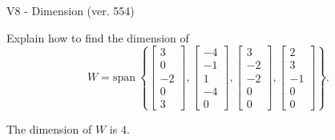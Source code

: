 \begin{exercise}
  \begin{exerciseTitle}V8 - Dimension (ver. 554)\end{exerciseTitle}
  \begin{exerciseStatement}
    Explain how to find the dimension of 
\[W=\mathrm{span}\ \left\{\left[\begin{array}{r}
3 \\
0 \\
-2 \\
0 \\
3
\end{array}\right] , \left[\begin{array}{r}
-4 \\
-1 \\
1 \\
-4 \\
0
\end{array}\right] , \left[\begin{array}{r}
3 \\
-2 \\
-2 \\
0 \\
0
\end{array}\right] , \left[\begin{array}{r}
2 \\
3 \\
-1 \\
0 \\
0
\end{array}\right]\right\}.\]



  \end{exerciseStatement}
  \begin{exerciseAnswer}
   The dimension of \(W\) is  \(4\).
  


  \end{exerciseAnswer}
\end{exercise}